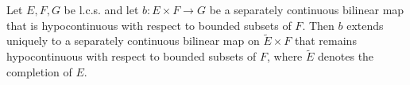 Let $E, F, G$ be l.c.s. and let $b: E \times F \rightarrow G$ be a separately continuous bilinear map that is hypocontinuous with respect to bounded subsets of $F$. Then $b$ extends uniquely to a separately continuous bilinear map on $\tilde{E} \times F$ that remains hypocontinuous with respect to bounded subsets of $F$, where $\tilde{E}$ denotes the completion of $E$.
